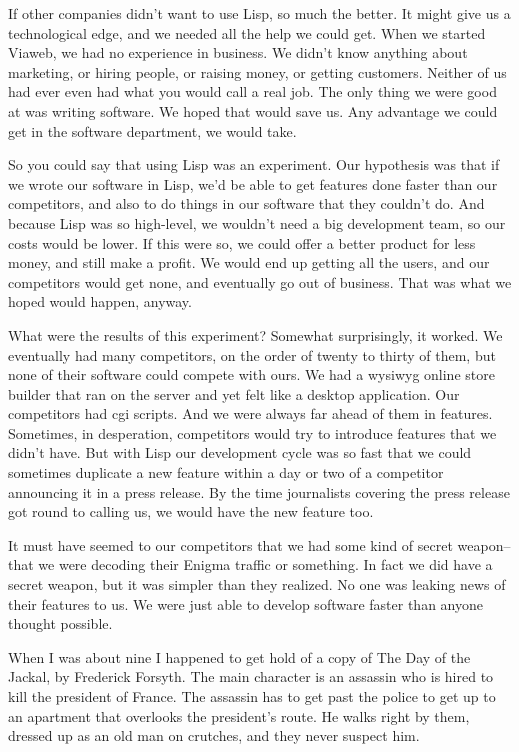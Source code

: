\documentclass[10pt,twoside,openright]{memoir}
\begin{document}
If other companies didn't want to use Lisp, so much the better. It might give us a technological edge, and we needed all the help we could get. When we started Viaweb, we had no experience in business. We didn't know anything about marketing, or hiring people, or raising money, or getting customers. Neither of us had ever even had what you would call a real job. The only thing we were good at was writing software. We hoped that would save us. Any advantage we could get in the software department, we would take.

So you could say that using Lisp was an experiment. Our hypothesis was that if we wrote our software in Lisp, we'd be able to get features done faster than our competitors, and also to do things in our software that they couldn't do. And because Lisp was so high-level, we wouldn't need a big development team, so our costs would be lower. If this were so, we could offer a better product for less money, and still make a profit. We would end up getting all the users, and our competitors would get none, and eventually go out of business. That was what we hoped would happen, anyway.

What were the results of this experiment? Somewhat surprisingly, it worked. We eventually had many competitors, on the order of twenty to thirty of them, but none of their software could compete with ours. We had a wysiwyg online store builder that ran on the server and yet felt like a desktop application. Our competitors had cgi scripts. And we were always far ahead of them in features. Sometimes, in desperation, competitors would try to introduce features that we didn't have. But with Lisp our development cycle was so fast that we could sometimes duplicate a new feature within a day or two of a competitor announcing it in a press release. By the time journalists covering the press release got round to calling us, we would have the new feature too.

It must have seemed to our competitors that we had some kind of secret weapon-- that we were decoding their Enigma traffic or something. In fact we did have a secret weapon, but it was simpler than they realized. No one was leaking news of their features to us. We were just able to develop software faster than anyone thought possible.

When I was about nine I happened to get hold of a copy of The Day of the Jackal, by Frederick Forsyth. The main character is an assassin who is hired to kill the president of France. The assassin has to get past the police to get up to an apartment that overlooks the president's route. He walks right by them, dressed up as an old man on crutches, and they never suspect him.
\end{document}
